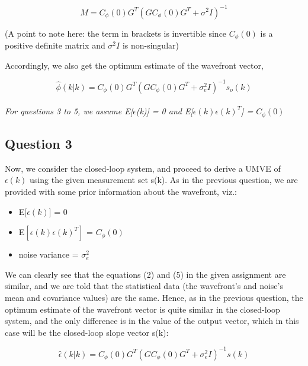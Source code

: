 \documentclass[12pt]{report}
\begin{document}
\begin{equation*}
	M = C_{\phi}(0)G^{T}(GC_{\phi}(0)G^{T} + \sigma^{2}I)^{-1}
\end{equation*}

(A point to note here: the term in brackets is invertible since $C_{\phi}(0)$ is a positive definite matrix and $\sigma^{2}I$ is non-singular)

Accordingly, we also get the optimum estimate of the wavefront vector,

\begin{equation*}
\hat\phi(k|k) = C_{\phi}(0)G^{T}(GC_{\phi}(0)G^{T} + \sigma_{e}^{2}I)^{-1}s_{o}(k)
\end{equation*}

\paragraph*{}
\textit{For questions 3 to 5, we assume E[$\epsilon$(k)] = 0 and E[$\epsilon(k)\epsilon(k)^T$] = $C_{\phi}(0)$}

\subsection*{Question 3}

Now, we consider the closed-loop system, and proceed to derive a UMVE of $\epsilon(k)$ using the given measurement set s(k).
As in the previous question, we are provided with some prior information about the wavefront, viz.:

\begin{itemize}
	\item E[$\epsilon(k)$] = 0
	\item E$\left[\epsilon(k)\epsilon(k)^T\right]$ = $C_{\phi}(0)$
	\item noise variance = $\sigma_{e}^{2}$
\end{itemize}

We can clearly see that the equations (2) and (5) in the given assignment are similar, and we are told that the statistical data (the wavefront's and noise's mean and covariance values) are the same. Hence, as in the previous question, the optimum estimate of the wavefront vector is quite similar in the closed-loop system, and the only difference is in the value of the output vector, which in this case will be the closed-loop slope vector s(k):

\begin{equation*}
\hat\epsilon(k|k) = C_{\phi}(0)G^{T}(GC_{\phi}(0)G^{T} + \sigma_{e}^{2}I)^{-1}s(k)
\end{equation*}
\end{document}
